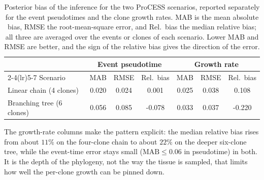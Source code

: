 \begin{table}[H]
\centering
\captionsetup{font=footnotesize}
\caption{Posterior bias of the inference for the two ProCESS scenarios, reported
separately for the event pseudotimes and the clone growth rates. MAB is the mean
absolute bias, RMSE the root-mean-square error, and Rel.\ bias the median relative
bias; all three are averaged over the events or clones of each scenario. Lower MAB
and RMSE are better, and the sign of the relative bias gives the direction of the
error.}
\label{tab:sim-bias}
\begin{tabular}{lcccccc}
\toprule
 & \multicolumn{3}{c}{Event pseudotime} & \multicolumn{3}{c}{Growth rate} \\
\cmidrule(lr){2-4}\cmidrule(lr){5-7}
Scenario & MAB & RMSE & Rel.\ bias & MAB & RMSE & Rel.\ bias \\
\midrule
Linear chain (4 clones)   & 0.020 & 0.024 & \phantom{-}0.001 & 0.025 & 0.038 & \phantom{-}0.108 \\
Branching tree (6 clones) & 0.056 & 0.085 & -0.078 & 0.033 & 0.037 & -0.220 \\
\bottomrule
\end{tabular}
\end{table}

The growth-rate columns make the pattern explicit: the median relative bias rises from
about $11\%$ on the four-clone chain to about $22\%$ on the deeper six-clone tree,
while the event-time error stays small ($\mathrm{MAB}\le 0.06$ in pseudotime) in both.
It is the depth of the phylogeny, not the way the tissue is sampled, that limits how
well the per-clone growth can be pinned down.

